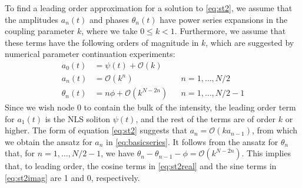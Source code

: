 \documentclass[11pt,reqno]{amsart}
\begin{document}
To find a leading order approximation for a solution to \cref{eq:st2}, we assume that the amplitudes $a_n(t)$ and phases $\theta_n(t)$ have power series expansions in the coupling parameter $k$, where we take $0 \leq k < 1$. Furthermore, we assume that these terms have the following orders of magnitude in $k$, which are suggested by numerical parameter continuation experiments:
\begin{equation}\label{eq:basicseries}
\begin{aligned}
a_0(t) &= \psi(t) + \mathcal{O}\left(k\right) \\
a_n(t) &= \mathcal{O}\left(k^n\right) && n = 1, \dots, N/2 \\
\theta_n(t) &= n \phi + \mathcal{O}\left(k^{N - 2n}\right) && n = 1, \dots, N/2-1
\end{aligned}
\end{equation}
Since we wish node 0 to contain the bulk of the intensity, the leading order term for $a_1(t)$ is the NLS soliton $\psi(t)$, and the rest of the terms are of order $k$ or higher. The form of equation \cref{eq:st2} suggests that $a_n = \mathcal{O}(k a_{n-1})$, from which we obtain the ansatz for $a_n$ in \cref{eq:basicseries}. It follows from the ansatz for $\theta_n$ that, for $n = 1, \dots, N/2-1$, we have $\theta_n - \theta_{n-1} - \phi = \mathcal{O}\left(k^{N - 2n}\right)$. This implies that, to leading order, the cosine terms in \cref{eq:st2real} and the sine terms in \cref{eq:st2imag} are 1 and 0, respectively.
\end{document}
